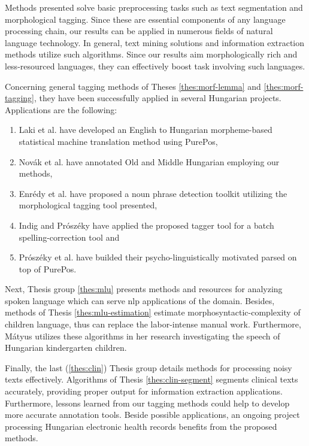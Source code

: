 
Methods presented solve basic preprocessing tasks such as text segmentation and morphological tagging. 
Since these are essential components of any language processing chain, our results can be applied in numerous fields of natural language technology. 
In general, text mining solutions and information extraction methods utilize such algorithms.
Since our results aim morphologically rich and less-resourced languages, they can effectively boost task involving such languages.

Concerning general tagging methods of Theses \ref{thes:morf-lemma} and \ref{thes:morf-tagging}, they have been successfully applied in several Hungarian projects.
Applications are the following:
\begin{enumerate}
\item Laki et al. \cite{Laki2013} have developed an English to Hungarian morpheme-based statistical machine translation method using PurePos,
\item Novák et al. \cite{Novak2013} have annotated Old and Middle Hungarian employing our methods,
\item Enrédy et al. \cite{Endredy2014} have proposed a noun phrase detection toolkit utilizing the morphological tagging tool presented,
\item Indig and Prószéky have applied \cite{Indig2013} the proposed tagger tool for a batch spelling-correction tool and
\item Prószéky et al. \cite{Proszeky2014} have builded their psycho-linguistically motivated parsed on top of PurePos.
\end{enumerate}

Next, Thesis group \ref{thes:mlu} presents methods and resources for analyzing spoken language which can serve \acrshort{nlp} applications of the domain.
Besides, methods of Thesis \ref{thes:mlu-estimation} estimate morphosyntactic-complexity of children language, thus can replace the labor-intense manual work.
Furthermore, Mátyus utilizes \cite{Matyus2014b} these algorithms in her research investigating the speech of Hungarian kindergarten children.

Finally, the last (\ref{thes:clin}) Thesis group details methods for processing noisy texts effectively.
Algorithms of Thesis \ref{thes:clin-segment} segments clinical texts accurately, providing proper output for information extraction applications. 
Furthermore, lessons learned from our tagging methods could help to develop more accurate annotation tools.
Beside possible applications, an ongoing project \cite{Siklosi2014,Siklosi2014mszny} processing Hungarian electronic health records benefits from the proposed methods.


